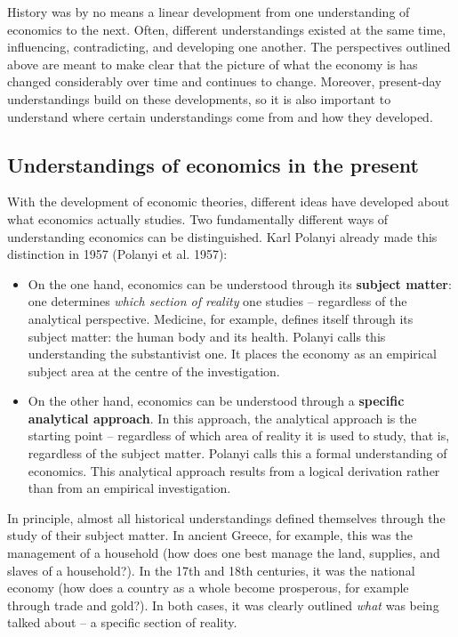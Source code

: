 \documentclass[
  british,
  a4paper,
  DIV=11,
  numbers=noendperiod,
  oneside,
  openany]{scrreprt}
\begin{document}
History was by no means a linear development from one understanding of
economics to the next. Often, different understandings existed at the
same time, influencing, contradicting, and developing one another. The
perspectives outlined above are meant to make clear that the picture of
what the economy is has changed considerably over time and continues to
change. Moreover, present-day understandings build on these
developments, so it is also important to understand where certain
understandings come from and how they developed.

\subsection{Understandings of economics in the
present}\label{understandings-of-economics-in-the-present}

With the development of economic theories, different ideas have
developed about what economics actually studies. Two fundamentally
different ways of understanding economics can be distinguished. Karl
Polanyi already made this distinction in 1957 (Polanyi et al. 1957):

\begin{itemize}
\item
  On the one hand, economics can be understood through its
  \textbf{subject matter}: one determines \emph{which section of
  reality} one studies -- regardless of the analytical perspective.
  Medicine, for example, defines itself through its subject matter: the
  human body and its health. Polanyi calls this understanding the
  substantivist one. It places the economy as an empirical subject area
  at the centre of the investigation.
\item
  On the other hand, economics can be understood through a
  \textbf{specific analytical approach}. In this approach, the
  analytical approach is the starting point -- regardless of which area
  of reality it is used to study, that is, regardless of the subject
  matter. Polanyi calls this a formal understanding of economics. This
  analytical approach results from a logical derivation rather than from
  an empirical investigation.
\end{itemize}

In principle, almost all historical understandings defined themselves
through the study of their subject matter. In ancient Greece, for
example, this was the management of a household (how does one best
manage the land, supplies, and slaves of a household?). In the 17th and
18th centuries, it was the national economy (how does a country as a
whole become prosperous, for example through trade and gold?). In both
cases, it was clearly outlined \emph{what} was being talked about -- a
specific section of reality.
\end{document}
